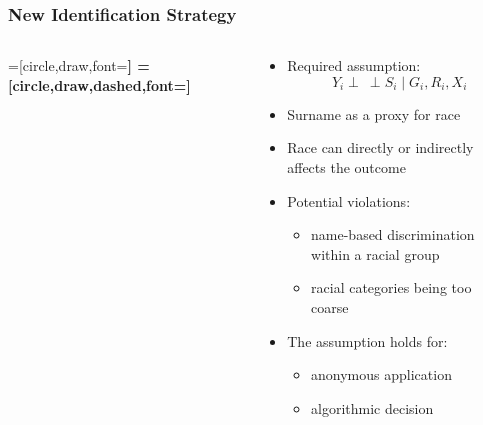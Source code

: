 \documentclass[handout]{beamer}
\newcommand{\indep}{\mathbin{\perp\!\!\!\!\!\:\perp}}
\begin{document}
\begin{frame}

\frametitle{New Identification Strategy}


  \begin{columns}
    \begin{column}{0.425\textwidth}
      =[circle,draw,font=\sffamily\Large\bfseries]
      =[circle,draw,dashed,font=\sffamily\Large\bfseries]
  \end{column}
   \begin{column}{0.575\textwidth}
      \begin{itemize}
        \item<2-> Required assumption: $$Y_i \indep S_i \mid G_i, R_i, X_i$$

        \item Surname as a proxy for race
        \item Race can directly or indirectly affects the outcome

          \bigskip
        \item Potential violations:
          \begin{itemize}
          \item name-based discrimination within a racial group
          \item racial categories being too coarse
         \end{itemize}
       \item The assumption holds for:
         \begin{itemize}
         \item anonymous application
         \item algorithmic decision
         \end{itemize}
      \end{itemize}
    \end{column}
  \end{columns}
  
\end{frame}
\end{document}
